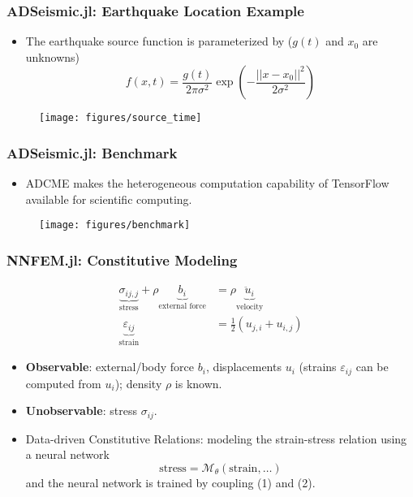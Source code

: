 \documentclass[usenames,dvipsnames]{beamer}
\begin{document}
\begin{frame}
	\frametitle{ADSeismic.jl: Earthquake Location Example}
	\begin{itemize}
		\item The earthquake source function is parameterized by ($g(t)$ and $x_0$ are unknowns)
		$$f(x, t) =  \frac{g(t)}{2\pi \sigma^2} \exp \left( -\frac{||x - x_0||^2}{2 \sigma^2} \right)$$
	\end{itemize}
	\begin{figure}[hbt]
  \texttt{[image: figures/source\_time]}
\end{figure}
\end{frame}


\begin{frame}
	\frametitle{ADSeismic.jl: Benchmark}
	\begin{itemize}
		\item ADCME makes the heterogeneous computation capability of TensorFlow available for scientific computing. 
	\end{itemize}
	\begin{figure}[hbt]
  \texttt{[image: figures/benchmark]}
\end{figure}
\end{frame}

\begin{frame}
	\frametitle{NNFEM.jl: Constitutive Modeling}
	
	\begin{equation}\label{equ:momentum}
  \begin{aligned}
		\underbrace{\sigma_{ij,j}}_{\mbox{stress}} + \rho \underbrace{b_i}_{\mbox{external force}} &= \rho \underbrace{\ddot u_i}_{\mbox{velocity}}\\
		\underbrace{\varepsilon_{ij}}_{\mbox{strain}} &= \frac{1}{2}(u_{j,i}+u_{i,j})
	\end{aligned}
\end{equation}

	
	\begin{itemize}
		\item \textbf{Observable}: external/body force $b_i$, displacements $u_i$ (strains $\varepsilon_{ij}$ can be computed from $u_i$); density $\rho$ is known.  
		\item \textbf{Unobservable}: stress $\sigma_{ij}$. 
		\item Data-driven Constitutive Relations: modeling the strain-stress relation using a neural network
\begin{equation}\label{equ:nn}
  	\boxed{\mbox{stress} =\mathcal{M}_{\theta}(\mbox{strain},\ldots)}
\end{equation}
		and the neural network is trained by coupling (1) and (2).
	\end{itemize}


\end{frame}
\end{document}
